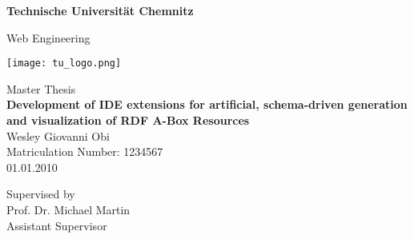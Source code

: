 \thispagestyle{empty}
\begin{center}

\vspace*{1.4cm}
{\LARGE \textbf{Technische Universität Chemnitz}}

\vspace{0.5cm}

{\large Web Engineering\\[1mm]}


\vspace*{1cm}

\texttt{[image: tu\_logo.png]}

\vspace*{1.0cm}

{\LARGE Master Thesis}\\

\vspace{1.0cm}
{\LARGE \textbf{Development of IDE extensions for artificial,
schema-driven generation and visualization
of RDF A-Box Resources}}\\
\vspace*{0.3cm}
\vspace*{1.0cm}
{\LARGE Wesley Giovanni Obi}
\\
\vspace*{0.5cm}
Matriculation Number: 1234567\\
01.01.2010\\ %
\vspace*{1.0cm}

Supervised by\\
Prof. Dr. Michael Martin\\


\vspace*{0.5cm}
Assistant Supervisor\\
\vspace{3cm}


\end{center}

